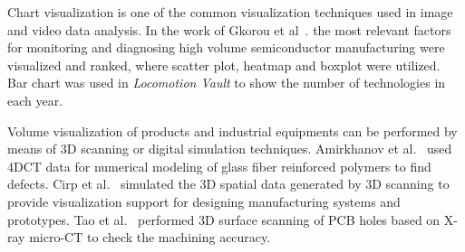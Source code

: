 \documentclass[a4paper,fleqn]{cas-dc}
\begin{document}
Chart visualization is one of the common visualization techniques used in image and video data analysis. In the work of Gkorou et al~\cite{Gkorou2017}. the most relevant factors for monitoring and diagnosing high volume semiconductor manufacturing were visualized and ranked, where scatter plot, heatmap and boxplot were utilized.
Bar chart was used in \textit{Locomotion Vault} to show the number of technologies in each year.

Volume visualization of products and industrial equipments can be performed by means of 3D scanning or digital simulation techniques.
Amirkhanov et al.~\cite{amirkhanov2016visual} used 4DCT data for numerical modeling of glass fiber reinforced polymers to find defects.
Cirp et al.~\cite{Cirp2019} simulated the 3D spatial data generated by 3D scanning to provide visualization support for designing manufacturing systems and prototypes.
Tao et al.~\cite{tao2020machining} performed 3D surface scanning of PCB holes based on X-ray micro-CT to check the machining accuracy.

\end{document}
